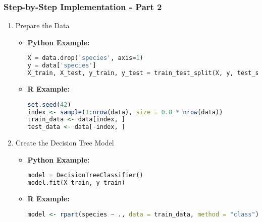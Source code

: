 \documentclass[aspectratio=169]{beamer}
\begin{document}
\begin{frame}[fragile]
    \frametitle{Step-by-Step Implementation - Part 2}
    \begin{enumerate}[resume]
        \item Prepare the Data
        \begin{itemize}
            \item \textbf{Python Example:}
            \begin{lstlisting}[language=Python]
X = data.drop('species', axis=1)
y = data['species']
X_train, X_test, y_train, y_test = train_test_split(X, y, test_size=0.2, random_state=42)
            \end{lstlisting}
            \item \textbf{R Example:}
            \begin{lstlisting}[language=R]
set.seed(42)
index <- sample(1:nrow(data), size = 0.8 * nrow(data))
train_data <- data[index, ]
test_data <- data[-index, ]
            \end{lstlisting}
        \end{itemize}

        \item Create the Decision Tree Model
        \begin{itemize}
            \item \textbf{Python Example:}
            \begin{lstlisting}[language=Python]
model = DecisionTreeClassifier()
model.fit(X_train, y_train)
            \end{lstlisting}
            \item \textbf{R Example:}
            \begin{lstlisting}[language=R]
model <- rpart(species ~ ., data = train_data, method = "class")
            \end{lstlisting}
        \end{itemize}
    \end{enumerate}
\end{frame}
\end{document}
